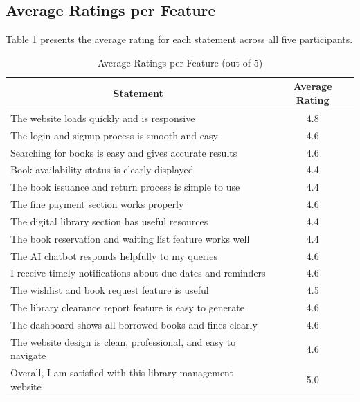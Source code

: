 \documentclass[12pt,a4paper]{report}
\begin{document}
\newpage

\subsection{Average Ratings per Feature}

Table \ref{tab:avgratings} presents the average rating for each statement across all five participants.

\vspace{0.3cm}

\begin{table}[h]
\centering
\begin{tabularx}{\textwidth}{|X|c|}
\hline
\multicolumn{1}{|c|}{\textbf{Statement}} & \multicolumn{1}{c|}{\textbf{Average Rating}} \\
\hline
The website loads quickly and is responsive & 4.8 \\
\hline
The login and signup process is smooth and easy & 4.6 \\
\hline
Searching for books is easy and gives accurate results & 4.6 \\
\hline
Book availability status is clearly displayed & 4.4 \\
\hline
The book issuance and return process is simple to use & 4.4 \\
\hline
The fine payment section works properly & 4.6 \\
\hline
The digital library section has useful resources & 4.4 \\
\hline
The book reservation and waiting list feature works well & 4.4 \\
\hline
The AI chatbot responds helpfully to my queries & 4.6 \\
\hline
I receive timely notifications about due dates and reminders & 4.6 \\
\hline
The wishlist and book request feature is useful & 4.5 \\
\hline
The library clearance report feature is easy to generate & 4.6 \\
\hline
The dashboard shows all borrowed books and fines clearly & 4.6 \\
\hline
The website design is clean, professional, and easy to navigate & 4.6 \\
\hline
Overall, I am satisfied with this library management website & 5.0 \\
\hline
\end{tabularx}
\caption{Average Ratings per Feature (out of 5)}
\label{tab:avgratings}
\end{table}
\end{document}
